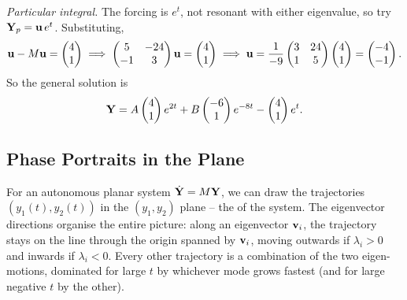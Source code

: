 \documentclass[a4paper]{scrartcl}
\begin{document}
\begin{example}
	\emph{Particular integral.} The forcing is $e^t$, not resonant with either eigenvalue, so try $\mathbf{Y}_p = \mathbf{u} \, e^t$. Substituting,
	$$
	\mathbf{u} - M \mathbf{u} = \begin{pmatrix} 4 \\ 1 \end{pmatrix} \implies \begin{pmatrix} 5 & -24 \\ -1 & 3 \end{pmatrix} \mathbf{u} = \begin{pmatrix} 4 \\ 1 \end{pmatrix} \implies \mathbf{u} = \frac{1}{-9}\begin{pmatrix} 3 & 24 \\ 1 & 5 \end{pmatrix}\begin{pmatrix} 4 \\ 1\end{pmatrix} = \begin{pmatrix} -4 \\ -1 \end{pmatrix}.
	$$
	So the general solution is
	$$
	\mathbf{Y} = A \begin{pmatrix} 4 \\ 1 \end{pmatrix} e^{2t} + B \begin{pmatrix} -6 \\ 1 \end{pmatrix} e^{-8t} - \begin{pmatrix} 4 \\ 1 \end{pmatrix} e^t.
	$$
\end{example}

\subsection{Phase Portraits in the Plane}

For an autonomous planar system $\dot{\mathbf{Y}} = M \mathbf{Y}$, we can draw the trajectories $(y_1(t), y_2(t))$ in the $(y_1, y_2)$ plane -- the  of the system. The eigenvector directions organise the entire picture: along an eigenvector $\mathbf{v}_i$, the trajectory stays on the line through the origin spanned by $\mathbf{v}_i$, moving outwards if $\lambda_i > 0$ and inwards if $\lambda_i < 0$. Every other trajectory is a combination of the two eigen-motions, dominated for large $t$ by whichever mode grows fastest (and for large negative $t$ by the other).
\end{document}
